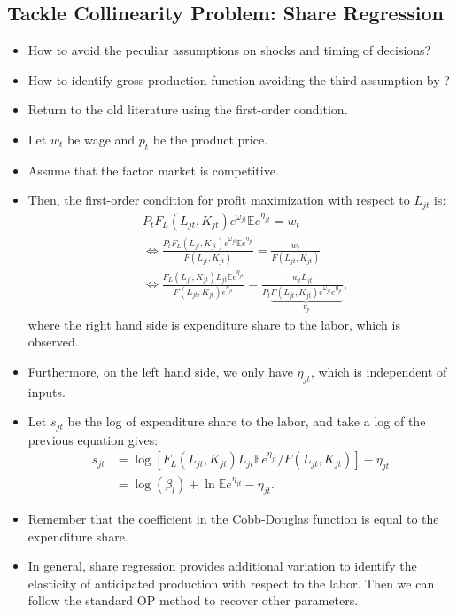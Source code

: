 \documentclass[
]{book}
\begin{document}
\hypertarget{tackle-collinearity-problem-share-regression}{%
\subsection{Tackle Collinearity Problem: Share Regression}\label{tackle-collinearity-problem-share-regression}}

\begin{itemize}
\item
  How to avoid the peculiar assumptions on shocks and timing of decisions?
\item
  How to identify gross production function avoiding the third assumption by \citet{Ackerberg2015}?
\item
  Return to the old literature using the first-order condition.
\item
  Let \(w_t\) be wage and \(p_t\) be the product price.
\item
  Assume that the factor market is competitive.
\item
  Then, the first-order condition for profit maximization with respect to \(L_{jt}\) is:
  \begin{equation}
  \begin{split}
  &P_t F_L(L_{jt}, K_{jt})e^{\omega_{jt}} \mathbb{E} e^{\eta_{jt}} = w_t\\
  &\Leftrightarrow \frac{P_t F_L(L_{jt}, K_{jt})e^{\omega_{jt}} \mathbb{E} e^{\eta_{jt}}}{F(L_{jt}, K_{jt}) } = \frac{w_t}{F(L_{jt}, K_{jt}) }\\
  &\Leftrightarrow \frac{F_L(L_{jt}, K_{jt}) L_{jt}\mathbb{E} e^{\eta_{jt}}}{F(L_{jt}, K_{jt})  e^{\eta_{jt}}} = \frac{w_t L_{jt}}{P_t \underbrace{F(L_{jt}, K_{jt}) e^{\omega_{jt}} e^{\eta_{jt}}}_{Y_{jt}} },
  \end{split}
  \end{equation}
  where the right hand side is expenditure share to the labor, which is observed.
\item
  Furthermore, on the left hand side, we only have \(\eta_{jt}\), which is independent of inputs.
\item
  Let \(s_{jt}\) be the log of expenditure share to the labor, and take a log of the previous equation gives:
  \begin{equation}
  \begin{split}
  s_{jt} &= \log [F_L(L_{jt}, K_{jt}) L_{jt} \mathbb{E} e^{\eta_{jt}} / F(L_{jt}, K_{jt})] - \eta_{jt}\\
  & = \log(\beta_l) + \ln \mathbb{E} e^{\eta_{jt}} - \eta_{jt}.
  \end{split}
  \end{equation}
\item
  Remember that the coefficient in the Cobb-Douglas function is equal to the expenditure share.
\item
  In general, share regression provides additional variation to identify the elasticity of anticipated production with respect to the labor.
  Then we can follow the standard OP method to recover other parameters.
\end{itemize}
\end{document}
